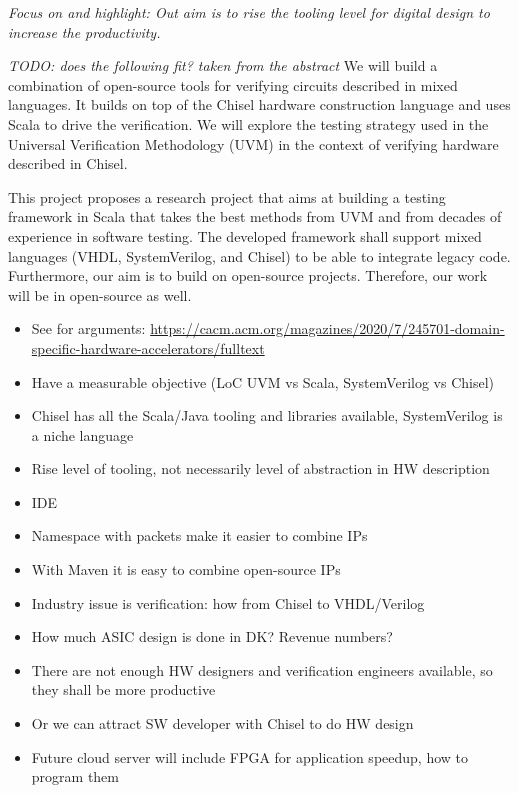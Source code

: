 \documentclass[fleqn,12pt]{article}
\newcommand{\todo}[1]{{\it TODO: #1}}
\begin{document}
\emph{Focus on and highlight: Out aim is to rise the tooling level for digital design to increase
the productivity.}

\todo{does the following fit? taken from the abstract}
We will build a combination of open-source tools for verifying
circuits described in mixed languages. It builds on top of the Chisel
hardware construction language and uses Scala to drive the verification. 
We will explore the testing strategy used in the Universal Verification Methodology
(UVM) in the context of verifying hardware described in Chisel.




This project proposes a research project that aims at building a testing framework
in Scala that takes the best methods from UVM and from decades of experience
in software testing.
The developed framework shall support mixed languages (VHDL, SystemVerilog, and Chisel)
to be able to integrate legacy code.
Furthermore, our aim is to build on open-source projects. Therefore, our
work will be in open-source as well.

\begin{itemize}
\item See for arguments: \url{https://cacm.acm.org/magazines/2020/7/245701-domain-specific-hardware-accelerators/fulltext}
\item Have a measurable objective (LoC UVM vs Scala, SystemVerilog vs Chisel)
\item Chisel has all the Scala/Java tooling and libraries available, SystemVerilog is a niche language
\item Rise level of tooling, not necessarily level of abstraction in HW description
\item IDE
\item Namespace with packets make it easier to combine IPs
\item With Maven it is easy to combine open-source IPs
\item Industry issue is verification: how from Chisel to VHDL/Verilog
\item How much ASIC design is done in DK? Revenue numbers?
\item There are not enough HW designers and verification engineers available, so they shall be more productive
\item Or we can attract SW developer with Chisel to do HW design
\item Future cloud server will include FPGA for application speedup, how to program them
\end{itemize}
\end{document}
